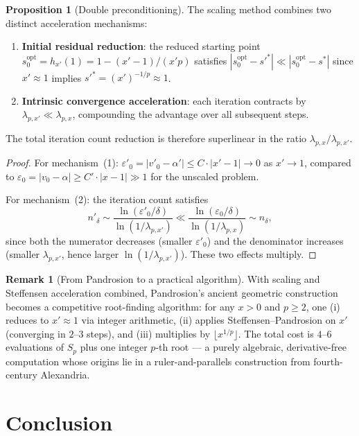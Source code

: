 \documentclass[11pt,a4paper]{article}
\theoremstyle{definition}
\newtheorem{proposition}{Proposition}[section]
\newtheorem{remark}{Remark}[section]
\newcommand{\eps}{\varepsilon}
\begin{document}
\begin{proposition}[Double preconditioning]
\label{prop:preconditioning}
The scaling method combines two distinct acceleration mechanisms:
\begin{enumerate}
  \item \textbf{Initial residual reduction}: the reduced starting point $s_0^{\mathrm{opt}} = h_{x'}(1) = 1 - (x'-1)/(x'p)$ satisfies $|s_0^{\mathrm{opt}} - s'^*| \ll |s_0^{\mathrm{opt}} - s^*|$ since $x' \approx 1$ implies $s'^* = (x')^{-1/p} \approx 1$.
  \item \textbf{Intrinsic convergence acceleration}: each iteration contracts by $\lambda_{p,x'} \ll \lambda_{p,x}$, compounding the advantage over all subsequent steps.
\end{enumerate}
The total iteration count reduction is therefore superlinear in the ratio $\lambda_{p,x}/\lambda_{p,x'}$.
\end{proposition}

\begin{proof}
For mechanism~(1): $\eps'_0 = |v'_0 - \alpha'| \leq C \cdot |x' - 1| \to 0$ as $x' \to 1$, compared to $\eps_0 = |v_0 - \alpha| \geq C' \cdot |x - 1| \gg 1$ for the unscaled problem.

For mechanism~(2): the iteration count satisfies
\[
  n'_\delta \sim \frac{\ln(\eps'_0/\delta)}{\ln(1/\lambda_{p,x'})} \ll \frac{\ln(\eps_0/\delta)}{\ln(1/\lambda_{p,x})} \sim n_\delta,
\]
since both the numerator decreases (smaller $\eps'_0$) and the denominator increases (smaller $\lambda_{p,x'}$, hence larger $\ln(1/\lambda_{p,x'})$). These two effects multiply.
\end{proof}

\begin{remark}[From Pandrosion to a practical algorithm]
With scaling and Steffensen acceleration combined, Pandrosion's ancient geometric construction becomes a competitive root-finding algorithm: for any $x > 0$ and $p \geq 2$, one (i) reduces to $x' \approx 1$ via integer arithmetic, (ii) applies Steffensen--Pandrosion on $x'$ (converging in $2$--$3$ steps), and (iii) multiplies by $\lfloor x^{1/p} \rfloor$. The total cost is $4$--$6$ evaluations of $S_p$ plus one integer $p$-th root --- a purely algebraic, derivative-free computation whose origins lie in a ruler-and-parallels construction from fourth-century Alexandria.
\end{remark}

\section{Conclusion}
\label{sec:conclusion}
\end{document}
